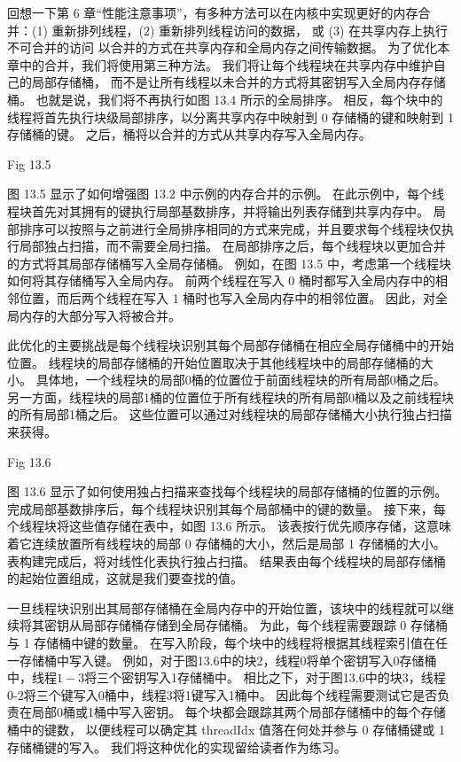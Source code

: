 回想一下第 6 章“性能注意事项”，有多种方法可以在内核中实现更好的内存合并：(1) 重新排列线程，(2) 重新排列线程访问的数据，
或 (3) 在共享内存上执行不可合并的访问 以合并的方式在共享内存和全局内存之间传输数据。 
为了优化本章中的合并，我们将使用第三种方法。 我们将让每个线程块在共享内存中维护自己的局部存储桶，
而不是让所有线程以未合并的方式将其密钥写入全局内存存储桶。 也就是说，我们将不再执行如图 13.4 所示的全局排序。 
相反，每个块中的线程将首先执行块级局部排序，以分离共享内存中映射到 0 存储桶的键和映射到 1 存储桶的键。 
之后，桶将以合并的方式从共享内存写入全局内存。

{\color{red} Fig 13.5}

图 13.5 显示了如何增强图 13.2 中示例的内存合并的示例。 
在此示例中，每个线程块首先对其拥有的键执行局部基数排序，并将输出列表存储到共享内存中。 
局部排序可以按照与之前进行全局排序相同的方式来完成，并且要求每个线程块仅执行局部独占扫描，而不需要全局扫描。 
在局部排序之后，每个线程块以更加合并的方式将其局部存储桶写入全局存储桶。 
例如，在图 13.5 中，考虑第一个线程块如何将其存储桶写入全局内存。 
前两个线程在写入 0 桶时都写入全局内存中的相邻位置，而后两个线程在写入 1 桶时也写入全局内存中的相邻位置。 
因此，对全局内存的大部分写入将被合并。

此优化的主要挑战是每个线程块识别其每个局部存储桶在相应全局存储桶中的开始位置。 
线程块的局部存储桶的开始位置取决于其他线程块中的局部存储桶的大小。 
具体地，一个线程块的局部0桶的位置位于前面线程块的所有局部0桶之后。 
另一方面，线程块的局部1桶的位置位于所有线程块的所有局部0桶以及之前线程块的所有局部1桶之后。 
这些位置可以通过对线程块的局部存储桶大小执行独占扫描来获得。

{\color{red} Fig 13.6}

图 13.6 显示了如何使用独占扫描来查找每个线程块的局部存储桶的位置的示例。 
完成局部基数排序后，每个线程块识别其每个局部桶中的键的数量。 接下来，每个线程块将这些值存储在表中，如图 13.6 所示。 
该表按行优先顺序存储，这意味着它连续放置所有线程块的局部 0 存储桶的大小，然后是局部 1 存储桶的大小。 
表构建完成后，将对线性化表执行独占扫描。 结果表由每个线程块的局部存储桶的起始位置组成，这就是我们要查找的值。

一旦线程块识别出其局部存储桶在全局内存中的开始位置，该块中的线程就可以继续将其密钥从局部存储桶存储到全局存储桶。 
为此，每个线程需要跟踪 0 存储桶与 1 存储桶中键的数量。 在写入阶段，每个块中的线程将根据其线程索引值在任一存储桶中写入键。 
例如，对于图13.6中的块2，线程0将单个密钥写入0存储桶中，线程$1-3$将三个密钥写入1存储桶中。 
相比之下，对于图13.6中的块3，线程0-2将三个键写入0桶中，线程3将1键写入1桶中。 
因此每个线程需要测试它是否负责在局部0桶或1桶中写入密钥。 
每个块都会跟踪其两个局部存储桶中的每个存储桶中的键数，
以便线程可以确定其 threadIdx 值落在何处并参与 0 存储桶键或 1 存储桶键的写入。 我们将这种优化的实现留给读者作为练习。

